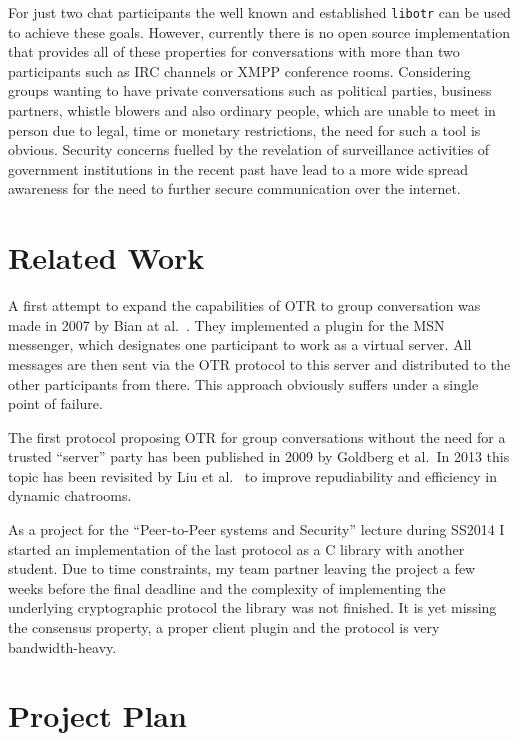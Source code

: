\documentclass[10pt,a4paper]{article}
\begin{document}
For just two chat participants the well known and established
\texttt{libotr}\cite{otr} can be used to achieve these goals.  However,
currently there is no open source implementation that provides all of these
properties for conversations with more than two participants such as IRC
channels or XMPP conference rooms. Considering groups wanting to have private
conversations such as political parties, business partners, whistle blowers and
also ordinary people, which are unable to meet in person due to legal, time or
monetary restrictions, the need for such a tool is obvious. Security concerns
fuelled by the revelation of surveillance activities of government institutions
in the recent past have lead to a more wide spread awareness for the need to
further secure communication over the internet.

\section{Related Work}

A first attempt to expand the capabilities of OTR to group conversation was made
in 2007 by Bian at al.\ \cite{gotr}. They implemented a plugin for the MSN
messenger, which designates one participant to work as a virtual server. All
messages are then sent via the OTR protocol to this server and distributed to
the other participants from there. This approach obviously suffers under a
single point of failure.

The first protocol proposing OTR for group conversations without the need for a
trusted “server” party \cite{mp-otr} has been published in 2009 by Goldberg et
al.\ In 2013 this topic has been revisited by Liu et al.\ \cite{impr-gotr} to
improve repudiability and efficiency in dynamic chatrooms.

As a project for the “Peer-to-Peer systems and Security” lecture during SS2014 I
started an implementation of the last protocol as a C library\cite{libgotr} with
another student. Due to time constraints, my team partner leaving the project a
few weeks before the final deadline and the complexity of implementing the
underlying cryptographic protocol the library was not finished. It is yet
missing the consensus property, a proper client plugin and the protocol is very
bandwidth-heavy.

\section{Project Plan}
\end{document}

